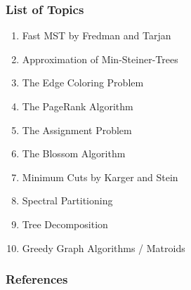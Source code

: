 \documentclass[titlepage,german,presentation]{beamer}
\begin{document}
\begin{frame}
\frametitle{List of Topics}
\begin{enumerate}
\item Fast MST by Fredman and Tarjan
\item Approximation of Min-Steiner-Trees
\item The Edge Coloring Problem
\item The PageRank Algorithm
\item The Assignment Problem  
\item The Blossom Algorithm 
\item Minimum Cuts by Karger and Stein
\item Spectral Partitioning
\item Tree Decomposition
\item Greedy Graph Algorithms / Matroids

\end{enumerate}

\end{frame}


\begin{frame}[allowframebreaks]
        \frametitle{References}
        
        
\end{frame}







\end{document}
